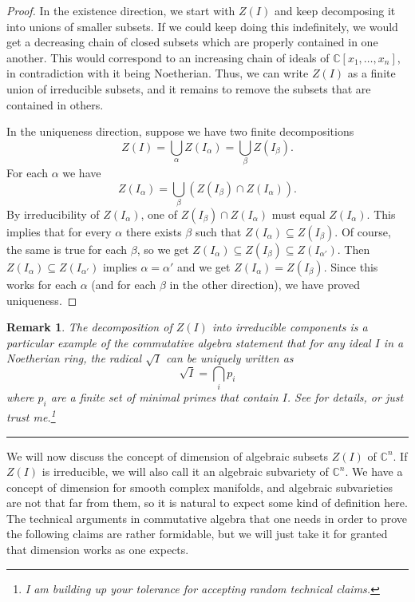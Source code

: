 \documentclass[11pt]{article}
\numberwithin{equation}{section}
\numberwithin{footnote}{section}
\newtheorem{rem}[thm]{Remark}
\newcommand{\blue}{\color{blue}}
\newcommand{\C}{{\mathbb C}}
\begin{document}
\begin{proof}
In the existence direction, we  start with $Z(I)$ and keep decomposing it into unions of smaller subsets.
If we could keep doing this indefinitely, we would get a decreasing chain of closed subsets which are properly contained in one another. This would correspond to an increasing chain of ideals of $\C[x_1,\ldots,x_n]$, in contradiction with it being Noetherian. Thus, we can write $Z(I)$ as a finite union of irreducible subsets, and it remains to remove the subsets that are contained in others.

In the uniqueness direction, suppose we have two finite decompositions
$$Z(I)= \bigcup_\alpha Z(I_\alpha) = \bigcup_\beta Z(I_\beta).$$
For each $\alpha$ we have 
$$
Z(I_\alpha) = \bigcup_\beta (Z(I_\beta)\cap Z(I_\alpha)).
$$
By irreducibility of $Z(I_\alpha)$, one of  $Z(I_\beta)\cap Z(I_\alpha)$ must equal $Z(I_\alpha)$. This implies that for every $\alpha$ there exists $\beta$ such that $Z(I_\alpha)\subseteq Z(I_\beta)$. Of course, the same is true for each $\beta$, so we get $Z(I_\alpha)\subseteq Z(I_\beta)\subseteq Z(I_{\alpha'})$. Then $Z(I_\alpha)\subseteq Z(I_{\alpha'})$ implies $\alpha = \alpha'$ and we get $Z(I_\alpha) = Z(I_\beta)$. Since this works for each $\alpha$ (and for each $\beta$ in the other direction), we have proved uniqueness.
\end{proof}


\smallskip
\begin{rem}
The decomposition of $Z(I)$ into irreducible components is a particular example of the commutative algebra statement that for any ideal $I$ in a Noetherian ring, the radical $\sqrt I$ can be uniquely written as 
$$
\sqrt I = \bigcap_i p_i
$$
where $p_i$ are a finite set of minimal primes that contain $I$. See \cite{AM} for details, or just trust me.\footnote{ I am building up your tolerance for accepting random technical claims.}
\end{rem}

\smallskip
{\blue \hrule}

\smallskip
We will now discuss the concept of dimension of algebraic subsets $Z(I)$ of $\C^n$. If $Z(I)$ is irreducible, we will also call it an {\blue algebraic subvariety} of $\C^n$. We have a concept of dimension for smooth complex manifolds, and algebraic subvarieties are not that far from them, so it is natural to expect some kind of definition here. The technical arguments in commutative algebra that one needs in order to prove the following claims are rather formidable, but we will just take it for granted that dimension works as one expects. 
\end{document}
